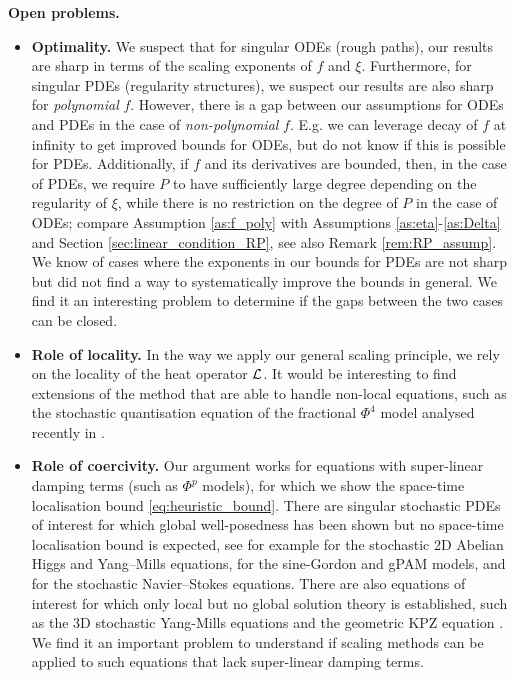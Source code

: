 \documentclass[11pt,a4paper]{article}
\numberwithin{equation}{section}
\theoremstyle{definition}
\theoremstyle{remark}
\begin{document}
\textbf{Open problems.}
\begin{itemize}
  \item \textbf{Optimality.} We suspect that for singular ODEs (rough paths), our results are sharp in terms of the scaling exponents of $f$ and $\xi$.
  Furthermore, for singular PDEs (regularity structures), we suspect our results are also sharp for \emph{polynomial} $f$.
  However, there is a gap between our assumptions for ODEs and PDEs in the case of \emph{non-polynomial} $f$. E.g. we can leverage decay of $f$ at infinity to get improved bounds for ODEs, but do not know if this is possible for PDEs.
  Additionally, if $f$ and its derivatives are bounded, then, in the case of PDEs, we require $P$ to have sufficiently large degree depending on the regularity of $\xi$, while there is no restriction on the degree of $P$ in the case of ODEs;
  compare Assumption \ref{as:f_poly} with Assumptions \ref{as:eta}-\ref{as:Delta} and Section \ref{sec:linear_condition_RP},
  see also Remark \ref{rem:RP_assump}.
  We know of cases where the exponents in our bounds for PDEs
  are not sharp but did not find a way to systematically improve the bounds in general.
  We find it an interesting problem to determine if the gaps between the two cases can be closed.
  
  \item \textbf{Role of locality.}
  In the way we apply our general scaling principle, we rely on the locality of the heat operator $\mathcal{L}$.
  It would be interesting to find extensions of the method that are able to handle non-local equations, such as the stochastic quantisation equation of the fractional $\Phi^4$ model analysed recently in \cite{Esquivel_Weber_24_fractional,DGR_23_fractional}.
  
  \item \textbf{Role of coercivity.}
  Our argument works for equations with super-linear damping terms (such as $\Phi^p$ models), for which we show the space-time localisation bound \eqref{eq:heuristic_bound}.
  There are singular stochastic PDEs of interest for which global well-posedness has been shown but no space-time localisation bound is expected, see for example \cite{BringmannCaoHiggs,ChevyrevShen23} for the stochastic 2D Abelian Higgs and Yang--Mills equations, \cite{BC24SG,CLFW24, SZZ25_gPAM} for the sine-Gordon and gPAM models, and \cite{Hairer_Rosati_NS,Hairer_Zhao_25_NS} for the stochastic Navier--Stokes equations.
  There are also equations of interest for which only local but no global solution theory is established,
  such as the 3D stochastic Yang-Mills equations \cite{CCHS_3D} and the geometric KPZ equation \cite{BGHZ22}.
  We find it an important problem to understand if scaling methods can be applied to such equations that lack super-linear damping terms. 
\end{itemize}
\end{document}
